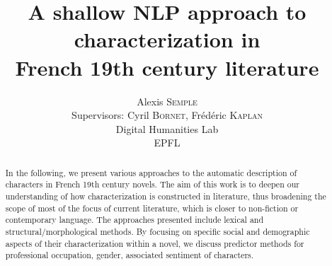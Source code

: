 \documentclass[a4paper, 11pt, titlepage]{article}
\title{A shallow NLP approach to characterization in \\French 19th century literature}
\author{Alexis \textsc{Semple} \\ 
Supervisors: Cyril \textsc{Bornet}, Frédéric \textsc{Kaplan} \\ 
Digital Humanities Lab \\
EPFL}
\begin{document}
\maketitle 

\begin{abstract}
In the following, we present various approaches to the automatic description of characters in French 19th century novels. 
The aim of this work is to deepen our understanding of how characterization is constructed in literature, thus broadening the scope of most of the focus of current literature, which is closer to non-fiction or contemporary language. The approaches presented include lexical and structural/morphological methods.
By focusing on specific social and demographic aspects of their characterization within a novel, we discuss predictor methods for professional occupation, gender, associated sentiment of characters.
\end{abstract}

\tableofcontents
\newpage













\newpage
\footnotesize
\nocite{*}


\end{document}
